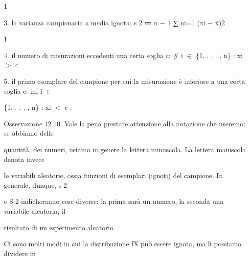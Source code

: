 \documentclass[a4paper,portrait,12pt]{article}
\begin{document}
1





\begin{flushleft}
3. la varianza campionaria a media ignota: s 2 ≔ n $-$ 1 ∑ ni=1 (xi $-$ x̄)2
\end{flushleft}


1





\begin{flushleft}
4. il numero di misurazioni eccedenti una certa soglia c: \# i $\in$ \{1, . . . , n\} : xi $>$ c
\end{flushleft}


\begin{flushleft}
5. il primo esemplare del campione per cui la misurazione \`{e} inferiore a una certa soglia c: inf i $\in$
\end{flushleft}


\begin{flushleft}
\{1, . . . , n\} : xi $<$ c .
\end{flushleft}


\begin{flushleft}
Osservazione 12.10. Vale la pena prestare attenzione alla notazione che useremo: se abbiamo delle
\end{flushleft}


\begin{flushleft}
quantit\`{a}, dei numeri, usiamo in genere la lettera minuscola. La lettera maiuscola denota invece
\end{flushleft}


\begin{flushleft}
le variabili aleatorie, ossia funzioni di esemplari (ignoti) del campione. In generale, dunque, s 2
\end{flushleft}


\begin{flushleft}
e S 2 indicheranno cose diverse: la prima sar\`{a} un numero, la seconda una variabile aleatoria, il
\end{flushleft}


\begin{flushleft}
risultato di un esperimento aleatorio.
\end{flushleft}





\begin{flushleft}
Ci sono molti modi in cui la distribuzione fX pu\`{o} essere ignota, ma li possiamo dividere in
\end{flushleft}
\end{document}
